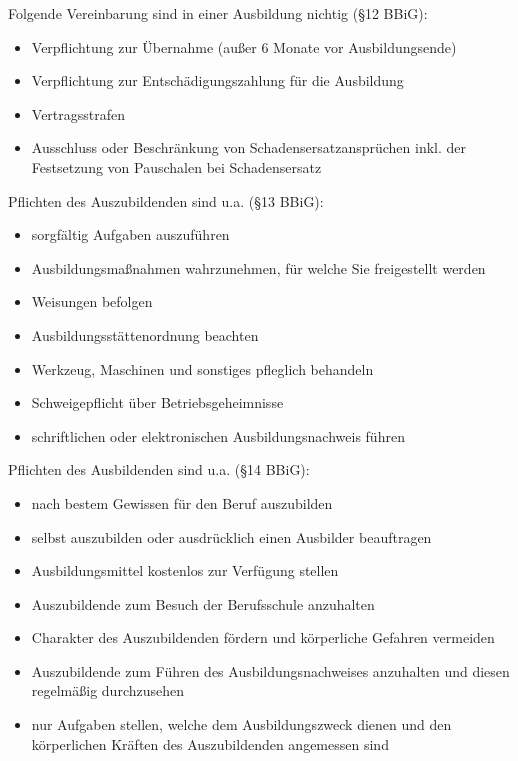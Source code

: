 Folgende Vereinbarung sind in einer Ausbildung nichtig (§12 BBiG):

\begin{itemize}
    \item Verpflichtung zur Übernahme (außer 6 Monate vor Ausbildungsende)
    \item Verpflichtung zur Entschädigungszahlung für die Ausbildung
    \item Vertragsstrafen
    \item Ausschluss oder Beschränkung von Schadensersatzansprüchen inkl. der Festsetzung von Pauschalen bei Schadensersatz
\end{itemize}

Pflichten des Auszubildenden sind u.a. (§13 BBiG):

\begin{itemize}
    \item sorgfältig Aufgaben auszuführen
    \item Ausbildungsmaßnahmen wahrzunehmen, für welche Sie freigestellt werden
    \item Weisungen befolgen
    \item Ausbildungsstättenordnung beachten
    \item Werkzeug, Maschinen und sonstiges pfleglich behandeln
    \item Schweigepflicht über Betriebsgeheimnisse
    \item schriftlichen oder elektronischen Ausbildungsnachweis führen
\end{itemize}

Pflichten des Ausbildenden sind u.a. (§14 BBiG):

\begin{itemize}
    \item nach bestem Gewissen für den Beruf auszubilden
    \item selbst auszubilden oder ausdrücklich einen Ausbilder beauftragen
    \item Ausbildungsmittel kostenlos zur Verfügung stellen
    \item Auszubildende zum Besuch der Berufsschule anzuhalten
    \item Charakter des Auszubildenden fördern und körperliche Gefahren vermeiden
    \item Auszubildende zum Führen des Ausbildungsnachweises anzuhalten und diesen regelmäßig durchzusehen
    \item nur Aufgaben stellen, welche dem Ausbildungszweck dienen und den körperlichen Kräften des Auszubildenden angemessen sind
\end{itemize}

